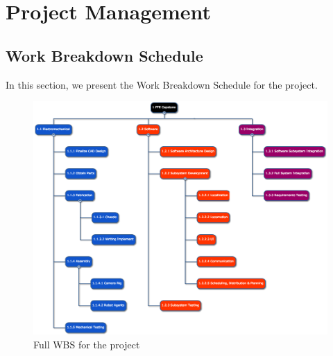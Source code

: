 \section{Project Management}
\label{sec:project_management}

\subsection{Work Breakdown Schedule}
\label{sec:wbs}

In this section, we present the Work Breakdown Schedule for the project.

\begin{figure}[h!]
\centering
\includegraphics[width=\textwidth]{wbs_schedule/wbs_1_31_17.png}
\caption{Full WBS for the project}
\label{fig:full-wbs}
\end{figure}

